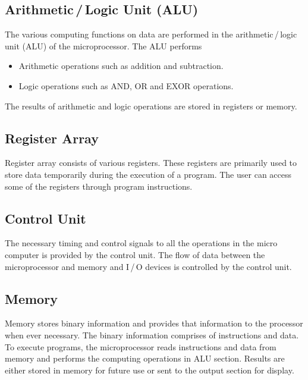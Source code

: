 \subsection{Arithmetic\,/\,Logic Unit (ALU)}\label{sec7.4.1}

The various computing functions on data are performed in the arithmetic\,/\,logic unit (ALU) of the microprocessor. The ALU performs
\begin{itemize}
\item Arithmetic operations such as addition and subtraction.

\item Logic operations such as AND, OR and EXOR operations.
\end{itemize}
The results of arithmetic and logic operations are stored in registers or memory.\\[-20pt]

\subsection{Register Array}\label{sec7.4.2}

Register array consists of various registers. These registers are primarily used to store data temporarily during the execution of a program. The user can access some of the registers through program instructions.\\[-20pt]

\subsection{Control Unit}\label{sec7.4.3}

The necessary timing and control signals to all the operations in the micro computer is provided by the control unit. The flow of data between the microprocessor and memory and I\,/\,O devices is controlled by the control unit.

\vfill\eject

\subsection{Memory}\label{sec7.4.4}

Memory stores binary information and provides that information to the processor when ever necessary. The binary information comprises of instructions and data. To execute programs, the microprocessor reads instructions and data from memory and performs the computing operations in ALU section. Results are either stored in memory for future use or sent to the output section for display.

